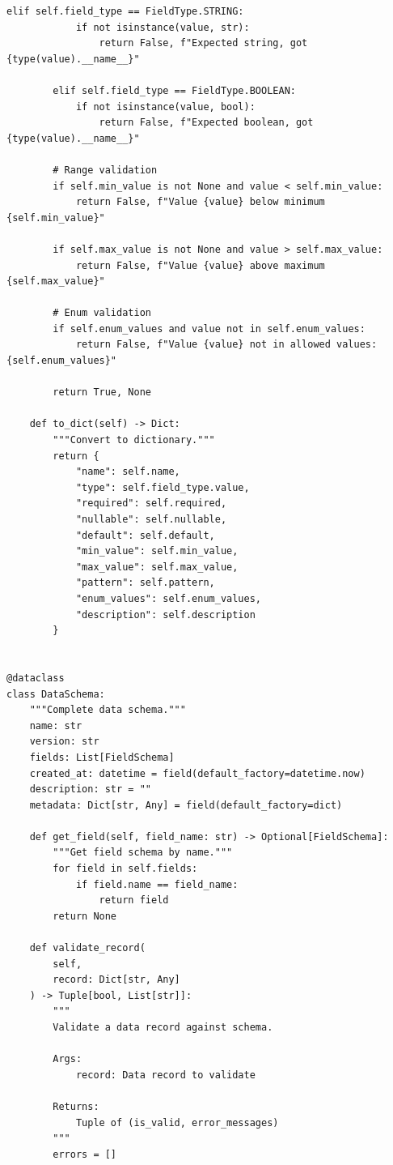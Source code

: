 \begin{lstlisting}[style=python, caption={Schema registry with versioning and compatibility}]
        elif self.field_type == FieldType.STRING:
            if not isinstance(value, str):
                return False, f"Expected string, got {type(value).__name__}"

        elif self.field_type == FieldType.BOOLEAN:
            if not isinstance(value, bool):
                return False, f"Expected boolean, got {type(value).__name__}"

        # Range validation
        if self.min_value is not None and value < self.min_value:
            return False, f"Value {value} below minimum {self.min_value}"

        if self.max_value is not None and value > self.max_value:
            return False, f"Value {value} above maximum {self.max_value}"

        # Enum validation
        if self.enum_values and value not in self.enum_values:
            return False, f"Value {value} not in allowed values: {self.enum_values}"

        return True, None

    def to_dict(self) -> Dict:
        """Convert to dictionary."""
        return {
            "name": self.name,
            "type": self.field_type.value,
            "required": self.required,
            "nullable": self.nullable,
            "default": self.default,
            "min_value": self.min_value,
            "max_value": self.max_value,
            "pattern": self.pattern,
            "enum_values": self.enum_values,
            "description": self.description
        }


@dataclass
class DataSchema:
    """Complete data schema."""
    name: str
    version: str
    fields: List[FieldSchema]
    created_at: datetime = field(default_factory=datetime.now)
    description: str = ""
    metadata: Dict[str, Any] = field(default_factory=dict)

    def get_field(self, field_name: str) -> Optional[FieldSchema]:
        """Get field schema by name."""
        for field in self.fields:
            if field.name == field_name:
                return field
        return None

    def validate_record(
        self,
        record: Dict[str, Any]
    ) -> Tuple[bool, List[str]]:
        """
        Validate a data record against schema.

        Args:
            record: Data record to validate

        Returns:
            Tuple of (is_valid, error_messages)
        """
        errors = []


\end{lstlisting}
